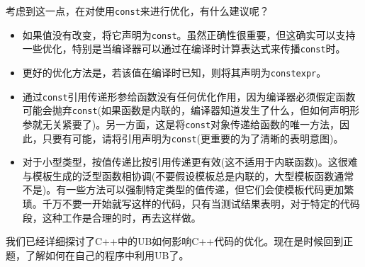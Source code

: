 考虑到这一点，在对使用\texttt{const}来进行优化，有什么建议呢？

\begin{itemize}
\item 
如果值没有改变，将它声明为\texttt{const}。虽然正确性很重要，但这确实可以支持一些优化，特别是当编译器可以通过在编译时计算表达式来传播\texttt{const}时。

\item 
更好的优化方法是，若该值在编译时已知，则将其声明为\texttt{constexpr}。

\item 
通过\texttt{const}引用传递形参给函数没有任何优化作用，因为编译器必须假定函数可能会抛弃\texttt{const}(如果函数是内联的，编译器知道发生了什么，但如何声明形参就无关紧要了)。另一方面，这是将\texttt{const}对象传递给函数的唯一方法，因此，只要有可能，请将引用声明为\texttt{const}(更重要的为了清晰的表明意图)。

\item 
对于小型类型，按值传递比按引用传递更有效(这不适用于内联函数)。这很难与模板生成的泛型函数相协调(不要假设模板总是内联的，大型模板函数通常不是)。有一些方法可以强制特定类型的值传递，但它们会使模板代码更加繁琐。千万不要一开始就写这样的代码，只有当测试结果表明，对于特定的代码段，这种工作是合理的时，再去这样做。

\end{itemize}

我们已经详细探讨了C++中的UB如何影响C++代码的优化。现在是时候回到正题，了解如何在自己的程序中利用UB了。
























